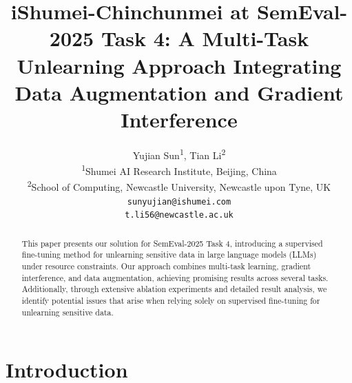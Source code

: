 \documentclass[11pt]{article}
\title{iShumei-Chinchunmei at SemEval-2025 Task 4: A Multi-Task Unlearning Approach Integrating Data Augmentation and Gradient Interference}
\author{
  Yujian Sun\textsuperscript{1},
  Tian Li\textsuperscript{2}
\\
  \textsuperscript{1}Shumei AI Research Institute, Beijing, China\\
  \textsuperscript{2}School of Computing, Newcastle University, Newcastle upon Tyne, UK
\\
  \texttt{sunyujian@ishumei.com}\\
  \texttt{t.li56@newcastle.ac.uk}
}
\begin{document}
\maketitle
\begin{abstract}


This paper presents our solution for SemEval-2025 Task 4, introducing a supervised fine-tuning method for unlearning sensitive data in large language models (LLMs) under resource constraints. Our approach combines multi-task learning, gradient interference, and data augmentation, achieving promising results across several tasks. Additionally, through extensive ablation experiments and detailed result analysis, we identify potential issues that arise when relying solely on supervised fine-tuning for unlearning sensitive data.
\end{abstract}

\section{Introduction}


\end{document}
